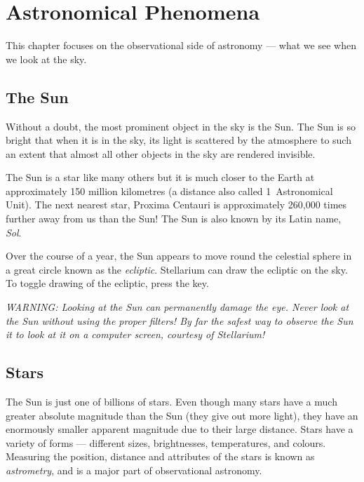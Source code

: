 


\chapter{Astronomical Phenomena}
\label{ch:Phenomena}

This chapter focuses on the observational side of astronomy --- what we
see when we look at the sky.

\section{The Sun}
\label{sec:Phenomena:sun}

Without a doubt, the most prominent object in the sky is the Sun. The
Sun is so bright that when it is in the sky, its light is scattered by
the atmosphere to such an extent that almost all other objects in the
sky are rendered invisible.

The Sun is a star like many others but it is much closer to the Earth
at approximately 150 million kilometres (a distance also called
1~Astronomical Unit). The next nearest star, Proxima Centauri is
approximately 260,000 times further away from us than the Sun! The Sun
is also known by its Latin name, \emph{Sol}.

Over the course of a year, the Sun appears to move round the celestial
sphere in a great circle known as the \emph{ecliptic}. Stellarium can
draw the ecliptic on the sky. To toggle drawing of the ecliptic, press
the \key{,} key.

\emph{WARNING: Looking at the Sun can permanently damage the eye. Never
look at the Sun without using the proper filters! By far the safest way
to observe the Sun it to look at it on a computer screen, courtesy of
Stellarium!}

\section{Stars}
\label{sec:Phenomena:stars}

The Sun is just one of billions of stars. Even though many stars have a
much greater absolute magnitude than the Sun (they give out more light),
they have an enormously smaller apparent magnitude due to their large
distance. Stars have a variety of forms --- different sizes,
brightnesses, temperatures, and colours. Measuring the position,
distance and attributes of the stars is known as \emph{astrometry}, and
is a major part of observational astronomy.

